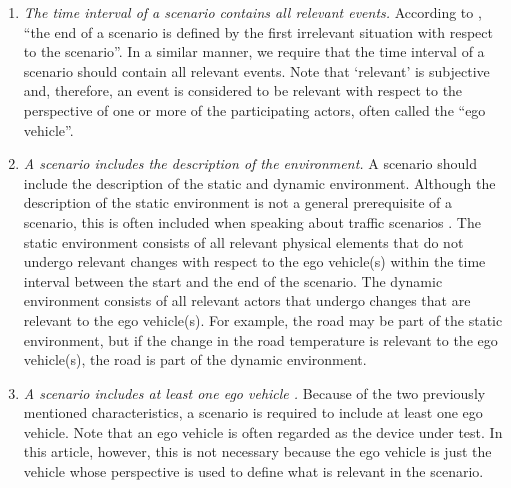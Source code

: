 \begin{enumerate}
	\item\textit{The time interval of a scenario contains all relevant events.}
	According to \textcite{geyer2014}, ``the end of a scenario is defined by the first irrelevant situation with respect to the scenario''. In a similar manner, we require that the time interval of a scenario should contain all relevant events. Note that `relevant' is subjective and, therefore, \cstarte an event is considered to be relevant with respect to the perspective of one or more of the participating actors, often called the ``ego vehicle''. \cende

	\item\textit{A scenario includes the description of the environment.}
	A scenario should include the description of the static and dynamic environment.
	Although the description of the static environment is not a general prerequisite of a scenario, this is often included when speaking about traffic scenarios \autocite{geyer2014, ulbrich2015, elrofai2016scenario, ebner2011identifying, althoff2017CommonRoad}.
	\cstartb The static environment consists of all relevant physical elements that do not undergo relevant changes with respect to the ego vehicle\cendb\cstartd (s) within the time interval between the start and the end of the scenario\cendd\cstartb. The dynamic environment consists of all relevant actors that \cendb\cstartd undergo \cendd\cstartb changes that are relevant to the ego vehicle\cendb\cstartd (s)\cendd\cstartb. For example, the road may be part of the static environment, but if the change in the road temperature is relevant to the ego vehicle\cendb\cstartd (s)\cendd\cstartb, the road is part of the dynamic environment.\cendb
	
	\cstartb
	\item\textit{A scenario includes \cendb\cstartd at least one \cendd\cstartb ego vehicle \autocite{geyer2014, elrofai2016scenario}.}
	Because of the two previously mentioned characteristics, a scenario is required to include \cendb\cstartd at least one \cendd\cstartb ego vehicle. \cendb
	\cstarte Note that an ego vehicle is often regarded as the device under test. In this article, however, this is not necessary because the ego vehicle is just the vehicle whose perspective is used to define what is relevant in the scenario. \cende
	

\end{enumerate}
